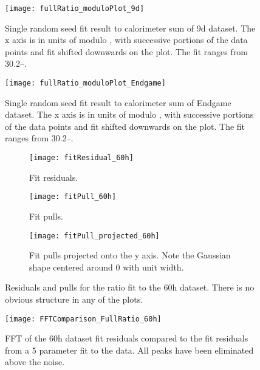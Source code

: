 \begin{figure}[]
    \centering
    \texttt{[image: fullRatio\_moduloPlot\_9d]}
    \caption[9d dataset calorimter sum fit result]{Single random seed fit result to calorimeter sum of 9d dataset. The x axis is in units of \mus{} modulo , with successive portions of the data points and fit shifted downwards on the plot. The fit ranges from 30.2--.}
    \label{fig:moduloPlot_9d}
\end{figure}

\begin{figure}[]
    \centering
    \texttt{[image: fullRatio\_moduloPlot\_Endgame]}
    \caption[Endgame dataset calorimter sum fit result]{Single random seed fit result to calorimeter sum of Endgame dataset. The x axis is in units of \mus{} modulo , with successive portions of the data points and fit shifted downwards on the plot. The fit ranges from 30.2--.}
    \label{fig:moduloPlot_Endgame}
\end{figure}




\begin{figure}[h]
\centering
    \begin{subfigure}[]{0.45\textwidth}
        \centering
        \texttt{[image: fitResidual\_60h]}
        \caption{Fit residuals.}
    \end{subfigure}
    \begin{subfigure}[]{0.45\textwidth}
        \centering
        \texttt{[image: fitPull\_60h]}
        \caption{Fit pulls.}
    \end{subfigure}%
    \vspace{4mm}
    \begin{subfigure}[]{0.7\textwidth}
        \centering
        \texttt{[image: fitPull\_projected\_60h]}
        \caption{Fit pulls projected onto the y axis. Note the Gaussian shape centered around 0 with unit width.}
    \end{subfigure}
\caption[Residuals and pulls for the ratio fit to the 60h dataset]{Residuals and pulls for the ratio fit to the 60h dataset. There is no obvious structure in any of the plots.}
\label{fig:fitResiduals_60h}
\end{figure}


\begin{figure}[]
    \centering
    \texttt{[image: FFTComparison\_FullRatio\_60h]}
    \caption[FFT of the 60h dataset fit residuals]{FFT of the 60h dataset fit residuals compared to the fit residuals from a 5 parameter fit to the data. All peaks have been eliminated above the noise.}
    \label{fig:FFT_60h}
\end{figure}



